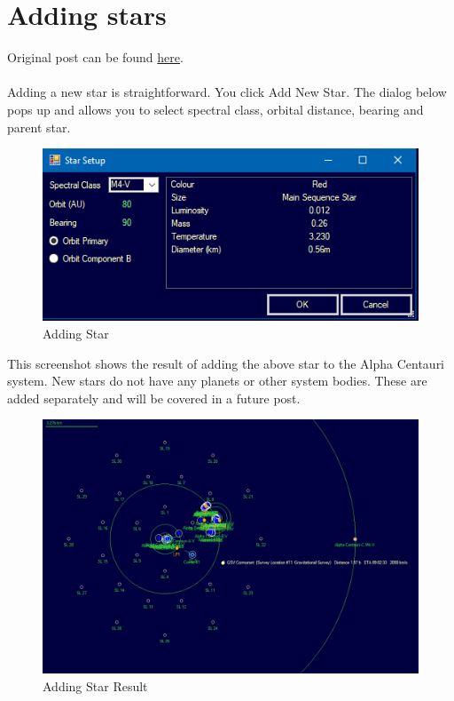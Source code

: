 \documentclass[../../Aurora C# unofficial manual.tex]{subfiles}
\begin{document}
	\section{Adding stars}\label{2_adding_stars}
	Original post can be found
	\href{http://aurora2.pentarch.org/index.php?topic=8495.msg118727#msg118727}{here}.
	\\\\
	
	Adding a new star is straightforward. You click Add New Star. The dialog below pops up and allows you to select spectral class, orbital distance, bearing and parent star.
	\begin{figure}[H]
		\centering
		\includegraphics[width=0.5\linewidth]{images/AddingStar}
		\caption[Adding Star]{Adding Star}
		\label{fig:addingstar}
	\end{figure}
	
	This screenshot shows the result of adding the above star to the Alpha Centauri system. New stars do not have any planets or other system bodies. These are added separately and will be covered in a future post.
	\begin{figure}[H]
		\centering
		\includegraphics[width=0.95\linewidth]{images/AddingStar2}
		\caption[Adding Star Result]{Adding Star Result}
		\label{fig:addingstar2}
	\end{figure}
\end{document}
